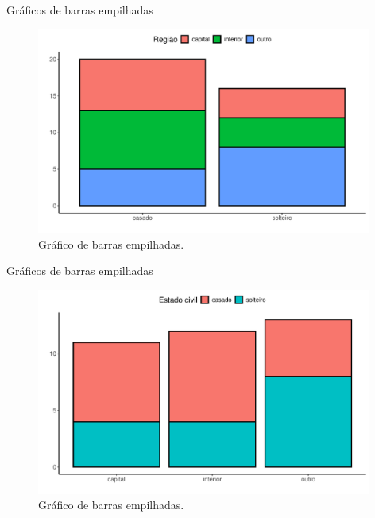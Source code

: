\documentclass[
  ignorenonframetext,
  serif,
  professionalfont,
  usenames,
  dvipsnames,
  aspectratio = 169]{beamer}
\begin{document}
\begin{frame}{Gráficos de barras empilhadas}
\label{gruxe1ficos-de-barras-empilhadas}
\begin{figure}

{\centering \includegraphics[width=11cm]{encontro2_files/figure-beamer/unnamed-chunk-26-1} 

}

\caption{Gráfico de barras empilhadas.}\label{fig:unnamed-chunk-26}
\end{figure}
\end{frame}

\begin{frame}{Gráficos de barras empilhadas}
\label{gruxe1ficos-de-barras-empilhadas-1}
\begin{figure}

{\centering \includegraphics[width=11cm]{encontro2_files/figure-beamer/unnamed-chunk-27-1} 

}

\caption{Gráfico de barras empilhadas.}\label{fig:unnamed-chunk-27}
\end{figure}
\end{frame}
\end{document}

